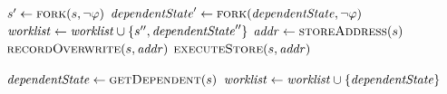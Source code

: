 \begin{algorithm}
\begin{algorithmic}[1]
           \label{alg:push-worklist-true-branch}
      \EndIf
      \State $\workstate' \gets \Call{fork}{\workstate, \neg\varphi}$ \label{alg:branch-fork-false1}
      \State $\dependentState' \gets \Call{fork}{\dependentState, \neg\varphi}$ \label{alg:branch-fork-false2}
        \label{alg:branch-feasible-false}
           \State $\mathit{worklist}  \gets  \mathit{worklist}  \cup \{s'', \mathit{dependentState}''\}$
           \label{alg:push-worklist-false-branch}
      \EndIf
      \Else
        \State {}  \label{alg:branch-normal}
      \EndIf
    \EndCase \label{alg:casebranch-end}
     \label{alg:casestore-begin}
      \State $\addr \gets \Call{storeAddress}{\workstate}$
      \State $\Call{recordOverwrite}{\workstate,\addr}$     \label{alg:record-overwrite}
      \State $\Call{executeStore}{\workstate,\addr}$     \label{alg:store-normal}
      \label{alg:store-check-recovery}
      \State {}
      \label{alg:store-udpate-dep-states}

      \EndIf
    \EndCase \label{alg:casestore-end}
     \label{alg:caseexit-begin}
       \label{alg:exit-check-recovery}
        \State {} \label{alg:exit-terminate-recovery}
        \State $\dependentState \gets  \Call{getDependent}{\workstate}$
        \label{alg:exit-extract-dependent}
        \State {} \label{alg:exit-resume}
        \State $\mathit{worklist} \gets  \mathit{worklist} \cup \{\mathit{dependentState}\}$
      \Else
        \State {}  \label{alg:exit-normal}
        \label{alg:push-worklist-exit}
      \EndIf
    \EndCase \label{alg:caseexit-end}
    \EndSwitch
  \EndWhile
  \EndFunction
\end{algorithmic}
\end{algorithm}

